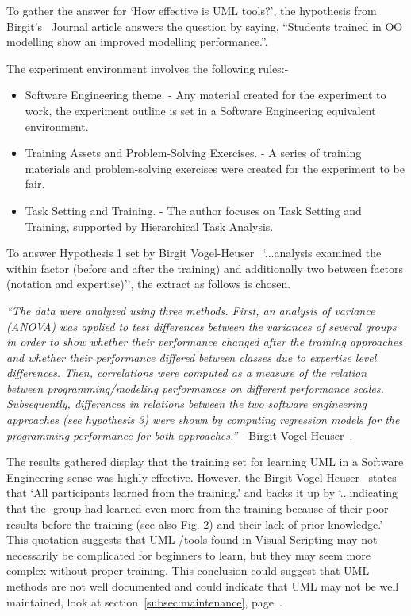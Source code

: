 \documentclass[12pt]{report} %
\begin{document}
			To gather the answer for `How effective is UML tools?', the hypothesis from Birgit's~\cite{vogel-heuser_evaluation_2013} Journal article answers the question by saying, ``Students trained in OO modelling show an improved modelling performance.''. 
		
			The experiment environment involves the following rules:-
			\begin{itemize}
			\item Software Engineering theme. - Any material created for the experiment to work, the experiment outline is set in a Software Engineering equivalent environment.
			\item Training Assets and Problem-Solving Exercises. - A series of training materials and problem-solving exercises were created for the experiment to be fair.
			\item Task Setting and Training. - The author focuses on Task Setting and Training, supported by Hierarchical Task Analysis.
			\end{itemize}

			\newpage
			To answer Hypothesis 1 set by Birgit Vogel-Heuser~\cite{vogel-heuser_evaluation_2013} `...analysis examined the within factor (before and after the training) and additionally two between factors (notation and expertise)'', the extract as follows is chosen.
			\begin{center}
				\textit{``The data were analyzed using three methods. First, an analysis of variance (ANOVA) was applied to test differences between the variances of several groups in order to show whether their performance changed after the training approaches and whether their performance differed between classes due to expertise level differences. Then, correlations were computed as a measure of the relation between programming/modeling performances on different performance scales. Subsequently, differences in relations between the two software engineering approaches (see hypothesis 3) were shown by computing regression models for the programming performance for both approaches.''} - Birgit Vogel-Heuser~\cite{vogel-heuser_evaluation_2013}. 
			\end{center}
				
			The results gathered display that the training set for learning UML in a Software Engineering sense was highly effective. However, the Birgit Vogel-Heuser~\cite{vogel-heuser_evaluation_2013} states that `All participants learned from the training.' and backs it up by `...indicating that the -group had learned even more from the training because of their poor results before the training (see also Fig. 2) and their lack of prior knowledge.' This quotation suggests that UML /tools found in Visual Scripting may not necessarily be complicated for beginners to learn, but they may seem more complex without proper training. This conclusion could suggest that UML methods are not well documented and could indicate that UML may not be well maintained, look at section~\ref{subsec:maintenance}, page~\pageref{subsec:maintenance}.
\end{document}
